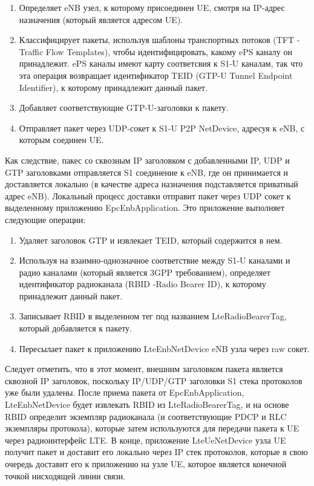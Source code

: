 \begin{enumerate}
  \item Определяет eNB узел, к которому присоединен UE, смотря на IP-адрес назначения (который является адресом UE).
  \item Классифицирует пакеты, используя шаблоны транспортных потоков (TFT - Traffic Flow Templates), чтобы идентифицировать, какому ePS каналу он принадлежит. ePS каналы имеют карту соответсвия к S1-U каналам, так что эта операция возвращает идентификатор TEID (GTP-U Tunnel Endpoint Identifier), к которому принадлежит данный пакет.
  \item Добавляет соответствующие GTP-U-заголовки к пакету.
  \item Отправляет пакет через UDP-сокет к S1-U P2P NetDevice, адресуя к eNB, с которым соединен UE.
\end{enumerate}
Как следствие, пакес со сквозным IP заголовком с добавленными IP, UDP и GTP заголовками отправляется S1 соединение к eNB, где он принимается и доставляется локально (в качестве адреса назначения подставляется приватный адрес eNB). Локальный процесс доставки отправит пакет через UDP сокет к выделенному приложению EpcEnbApplication. Это приложение выполняет следующие операции:
\begin{enumerate}
  \item Удаляет заголовок GTP и извлекает TEID, который содержится в нем.
  \item Используя на взаимно-однозначное соответствие между S1-U каналами и радио каналами (который является 3GPP требованием), определяет идентификатор радиоканала (RBID -Radio Bearer ID), к которому принадлежит данный пакет.
  \item Записывает RBID в выделенном тег под названием LteRadioBearerTag, который добавляется к пакету.
  \item Пересылает пакет к приложению LteEnbNetDevice eNB узла через raw сокет.
\end{enumerate}
Следует отметить, что в этот момент, внешним заголовком пакета является сквозной IP заголовок, поскольку IP/UDP/GTP заголовки S1 стека протоколов уже были удалены. После приема пакета от EpcEnbApplication, LteEnbNetDevice будет извлекать RBID из LteRadioBearerTag, и на основе RBID определит экземпляр радиоканала (и соответствующие PDCP и RLC экземпляры протокола), которые затем используются для передачи пакета к UE через радиоинтерфейс LTE. В конце, приложение LteUeNetDevice узла UE получит пакет и доставит его локально через IP стек протоколов, которые в свою очередь доставит его к приложению на узле UE, которое является конечной точкой нисходящей линии связи.

